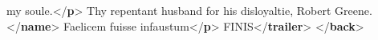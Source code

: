 \begin{shaded}
\hspace*{1em}\hspace*{1em}\hspace*{1em}\hspace*{1em} my soule.{</\textbf{p}>}\mbox{}\newline 
\hspace*{1em}Thy repentant husband for his disloyaltie,\mbox{}\newline 
\hspace*{1em}Robert Greene.{</\textbf{name}>}\mbox{}\newline 
\hspace*{1em}\mbox{}\newline 
\hspace*{1em}\mbox{}\newline 
\hspace*{1em}\hspace*{1em}Faelicem fuisse infaustum{</\textbf{p}>}\mbox{}\newline 
\hspace*{1em}\mbox{}\newline 
\hspace*{1em}FINIS{</\textbf{trailer}>}\mbox{}\newline 
{}\mbox{}\newline 
{</\textbf{back}>}\end{shaded}\egroup\par \noindent  \par
